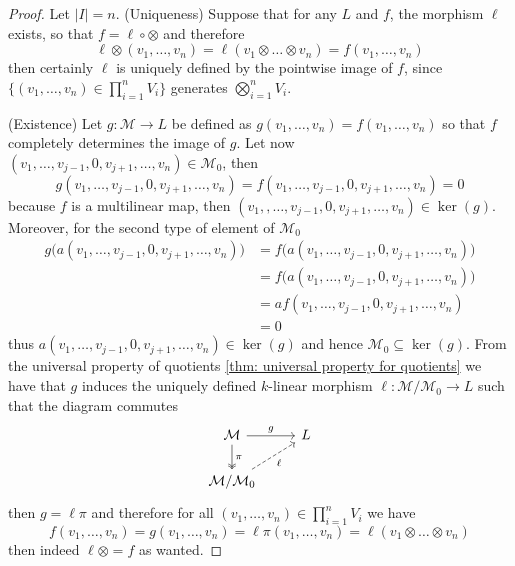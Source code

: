 \begin{proof}
    Let \(|I| = n\). (Uniqueness) Suppose that for any \(L\) and \(f\), the
    morphism \(\ell\) exists, so that \(f = \ell \circ \otimes\) and therefore
    \[
        \ell \otimes (v_1, \dots, v_n) = \ell(v_1 \otimes \dots \otimes v_n)
        = f(v_1, \dots, v_n)
    \]
    then certainly \(\ell\) is uniquely defined by the pointwise image of \(f\),
    since \(\{(v_1, \dots, v_n) \in \prod_{i=1}^n V_i\}\) generates
    \(\bigotimes_{i=1}^n V_i\).

    (Existence) Let \(g : \mathcal M \to L\) be defined as \(g(v_1, \dots, v_n) =
    f(v_1, \dots, v_n)\) so that \(f\) completely determines the image of \(g\).
    Let now \((v_1, \dots, v_{j-1}, 0, v_{j+1}, \dots, v_n) \in \mathcal M_0\),
    then
    \[
        g(v_1, \dots, v_{j-1}, 0, v_{j+1}, \dots, v_n)
        = f(v_1, \dots, v_{j-1}, 0, v_{j+1}, \dots, v_n) = 0
    \]
    because \(f\) is a multilinear map, then \((v_1,, \dots, v_{j-1}, 0, v_{j+1},
    \dots, v_n) \in \ker(g)\). Moreover, for the second type of element of
    \(\mathcal M_0\)
    \begin{align*}
        g\big(a(v_1, \dots, v_{j-1}, 0, v_{j+1}, \dots, v_n)\big)
         & = f\big(a(v_1, \dots, v_{j-1}, 0, v_{j+1}, \dots, v_n)\big) \\
         & = f\big(a(v_1, \dots, v_{j-1}, 0, v_{j+1}, \dots, v_n)\big) \\
         & = a f(v_1, \dots, v_{j-1}, 0, v_{j+1}, \dots, v_n)          \\
         & = 0
    \end{align*}
    thus \(a(v_1, \dots, v_{j-1}, 0, v_{j+1}, \dots, v_n) \in \ker(g)\) and
    hence \(\mathcal M_0 \subseteq \ker(g)\). From the universal property of
    quotients \cref{thm: universal property for quotients} we have that \(g\)
    induces the uniquely defined \(k\)-linear morphism \(\ell: \mathcal M /
    \mathcal M_0 \to L\) such that the diagram commutes
    \[
        \begin{tikzcd}
            \mathcal M
            \ar[d, two heads, "\pi"]
            \ar[r, "g"]
            &L \\
            \mathcal M / \mathcal M_0
            \ar[ur, swap, dashed, "\ell"]
            &
        \end{tikzcd}
    \]
    then \(g = \ell \pi\) and therefore for all \((v_1, \dots, v_n) \in
    \prod_{i=1}^n V_i\) we have
    \[
        f(v_1, \dots, v_n)
        = g(v_1, \dots, v_n)
        = \ell \pi (v_1, \dots, v_n)
        = \ell(v_1 \otimes \dots \otimes v_n)
    \]
    then indeed \(\ell \otimes = f\) as wanted.
\end{proof}


